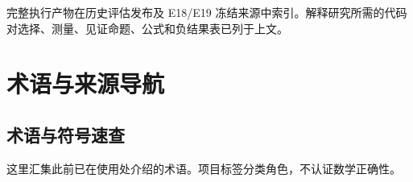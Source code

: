 完整执行产物在历史评估发布及 E18/E19 冻结来源中索引。解释研究所需的代码对选择、测量、见证命题、公式和负结果表已列于上文。

\section[术语与来源导航]{\texorpdfstring{\protect\hypertarget{appendix-e}{}术语与来源导航}{术语与来源导航}}
\subsection[术语与符号速查]{\texorpdfstring{\protect\hypertarget{e1}{}术语与符号速查}{术语与符号速查}}
这里汇集此前已在使用处介绍的术语。项目标签分类角色，不认证数学正确性。

\begingroup\small\setlength{\tabcolsep}{3pt}\renewcommand{\arraystretch}{1.14}
